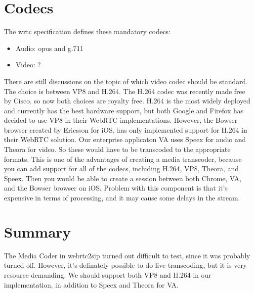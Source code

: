 \section{Codecs}

The \gls{wrtc} specification defines these mandatory codecs:
\begin{itemize}
    \item Audio: opus and g.711
    \item Video: ?
\end{itemize}

There are still discussions on the topic of which video codec should be standard. The choice is between VP8 and H.264. The H.264 codec was recently made free by Cisco\cite{h264-free}, so now both choices are royalty free. H.264 is the most widely deployed and currently has the best hardware support, but both Google and Firefox has decided to use VP8 in their WebRTC implementations. However, the Bowser browser created by Ericsson for iOS, has only implemented support for H.264 in their WebRTC solution. Our enterprise applicaton VA uses Speex for audio and Theora for video. So these would have to be transcoded to the appropriate formats. This is one of the advantages of creating a media transcoder, because you can add support for all of the codecs, including H.264, VP8, Theora, and Speex. Then you would be able to create a session between both Chrome, VA, and the Bowser browser on iOS. Problem with this component is that it's expensive in terms of processing, and it may cause some delays in the stream.

\section{Summary}
The Media Coder in webrtc2sip turned out difficult to test, since it was probably turned off. However, it's definately possible to do live transcoding, but it is very resource demanding. We should support both VP8 and H.264 in our implementation, in addition to Speex and Theora for VA.